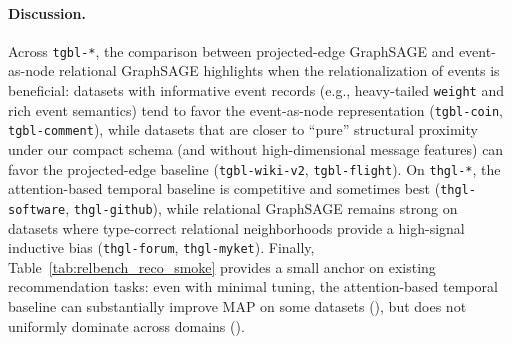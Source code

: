 \paragraph{Discussion.}
Across \texttt{tgbl-*}, the comparison between projected-edge GraphSAGE and event-as-node relational GraphSAGE highlights when the relationalization of events is beneficial: datasets with informative event records (e.g., heavy-tailed \texttt{weight} and rich event semantics) tend to favor the event-as-node representation (\texttt{tgbl-coin}, \texttt{tgbl-comment}), while datasets that are closer to ``pure'' structural proximity under our compact schema (and without high-dimensional message features) can favor the projected-edge baseline (\texttt{tgbl-wiki-v2}, \texttt{tgbl-flight}).
On \texttt{thgl-*}, the attention-based temporal baseline is competitive and sometimes best (\texttt{thgl-software}, \texttt{thgl-github}), while relational GraphSAGE remains strong on datasets where type-correct relational neighborhoods provide a high-signal inductive bias (\texttt{thgl-forum}, \texttt{thgl-myket}).
Finally, Table~\ref{tab:relbench_reco_smoke} provides a small anchor on existing \relbench recommendation tasks: even with minimal tuning, the attention-based temporal baseline can substantially improve MAP on some datasets (\fone), but does not uniformly dominate across domains (\stack).

